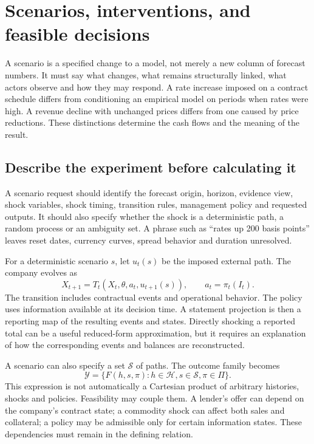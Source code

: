 \chapter[Scenarios and feasible decisions]{Scenarios, interventions, and feasible decisions}
\label{sim:scenarios}

A scenario is a specified change to a model, not merely a new column of forecast numbers. It must say what changes, what remains structurally linked, what actors observe and how they may respond. A rate increase imposed on a contract schedule differs from conditioning an empirical model on periods when rates were high. A revenue decline with unchanged prices differs from one caused by price reductions. These distinctions determine the cash flows and the meaning of the result.

\section{Describe the experiment before calculating it}
A scenario request should identify the forecast origin, horizon, evidence view, shock variables, shock timing, transition rules, management policy and requested outputs. It should also specify whether the shock is a deterministic path, a random process or an ambiguity set. A phrase such as ``rates up 200 basis points'' leaves reset dates, currency curves, spread behavior and duration unresolved.

For a deterministic scenario $s$, let $u_t(s)$ be the imposed external path. The company evolves as
\begin{equation}
 X_{t+1}=T_t(X_t,\theta,a_t,u_{t+1}(s)),\qquad a_t=\pi_t(I_t).
 \label{sim:scenario-transition}
\end{equation}
The transition includes contractual events and operational behavior. The policy uses information available at its decision time. A statement projection is then a reporting map of the resulting events and states. Directly shocking a reported total can be a useful reduced-form approximation, but it requires an explanation of how the corresponding events and balances are reconstructed.

A scenario can also specify a set $\mathcal S$ of paths. The outcome family becomes
\begin{equation}
 \mathcal Y=\{F(h,s,\pi):h\in\mathcal H, s\in\mathcal S, \pi\in\Pi\}.
\end{equation}
This expression is not automatically a Cartesian product of arbitrary histories, shocks and policies. Feasibility may couple them. A lender's offer can depend on the company's contract state; a commodity shock can affect both sales and collateral; a policy may be admissible only for certain information states. These dependencies must remain in the defining relation.


